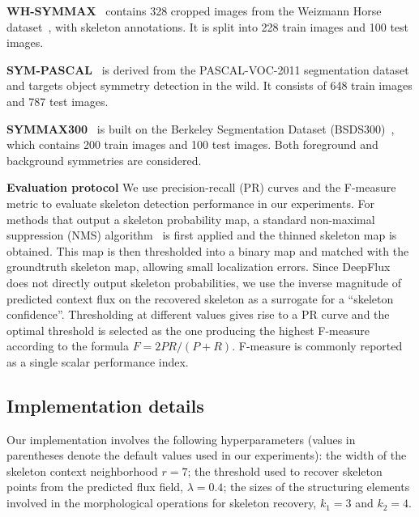 \documentclass[10pt,twocolumn,letterpaper]{article}
\begin{document}
\medskip

\noindent\textbf{WH-SYMMAX}~\cite{shen2016misl} contains 328 cropped images from the Weizmann Horse dataset~\cite{borenstein2002horse}, with skeleton annotations.
It is split into 228 train images and 100 test images.

\medskip

\noindent\textbf{SYM-PASCAL}~\cite{ke2017srn} is derived from the PASCAL-VOC-2011 segmentation dataset~\cite{everingham2010pascalvoc} and targets object symmetry detection in the wild.
It consists of 648 train images and 787 test images.

\medskip

\noindent\textbf{SYMMAX300}~\cite{tsogkas2012mil} is built on the Berkeley Segmentation Dataset (BSDS300)~\cite{martin2001bsds}, which contains 200 train images and 100 test images.
Both foreground and background symmetries are considered.

\medskip

\noindent\textbf{Evaluation protocol}
We use precision-recall (PR) curves and the F-measure metric to evaluate skeleton detection performance in our experiments.
For methods that output a skeleton probability map, a standard non-maximal suppression (NMS) algorithm~\cite{dollar2015nms} is first applied and the thinned skeleton map is obtained.
This map is then thresholded into a binary map and matched with the groundtruth skeleton map, allowing small localization errors.
Since DeepFlux does not directly output skeleton probabilities, we use the inverse magnitude of predicted context flux on the recovered skeleton as a surrogate for a ``skeleton confidence''.
Thresholding at different values gives rise to a PR curve and the optimal threshold is selected as the one producing the highest F-measure according to the formula $F = 2PR/(P+R)$.
F-measure is commonly reported as a single scalar performance index.

\subsection{Implementation details} \label{sec:implementation}
Our implementation involves the following hyperparameters (values in parentheses denote the default values used in our experiments):
the width of the skeleton context neighborhood $r=7$;
the threshold used to recover skeleton points from the predicted flux field, $\lambda=0.4$;
the sizes of the structuring elements involved in the morphological operations for skeleton recovery, $k_1=3$ and $k_2=4$.
\end{document}

